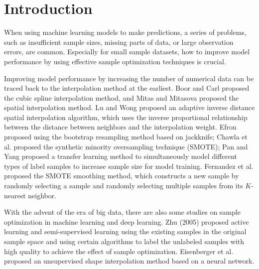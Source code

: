 \documentclass[mathematics,article,accept,pdftex,moreauthors]{Definitions/mdpi}
\begin{document}
\section{ Introduction}

When using machine learning models to make predictions, a series of problems, such as insufficient sample sizes, missing parts of data, or large observation errors, are common. Especially for small sample datasets, how to improve model performance by using effective sample optimization techniques is crucial.
 
Improving model performance by increasing the number of numerical data can be traced back to the interpolation method at the earliest. Boor and Carl \cite{ref1} proposed the cubic spline interpolation method, and Mitas and Mitasova \cite{ref2} proposed the spatial interpolation method. Lu and Wong \cite{ref3} proposed an adaptive inverse distance spatial interpolation algorithm, which uses the inverse proportional relationship between the distance between neighbors and the interpolation weight. Efron \cite{ref4} proposed using the bootstrap resampling method based on jackknife; Chawla et al. \cite{ref5} proposed the synthetic minority oversampling technique (SMOTE); Pan and Yang \cite{ref6} proposed a transfer learning method to simultaneously model different types of label samples to increase sample size for model training. Fernandez et al. \cite{ref7} proposed the SMOTE smoothing method, which constructs a new sample by randomly selecting a sample and randomly selecting multiple samples from its $K$-nearest neighbor.

With the advent of the era of big data, there are also some studies on sample optimization in machine learning and deep learning.  Zhu (2005) \cite{ref8} proposed active learning and semi-supervised learning using the existing samples in the original sample space and using certain algorithms to label the unlabeled samples with high quality to achieve the effect of sample optimization. Eisenberger et al. \cite{ref9} proposed an unsupervised shape interpolation method based on a neural network.
\end{document}
